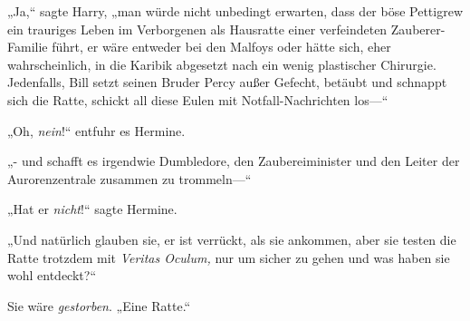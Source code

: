 „Ja,“ sagte Harry, „man würde nicht unbedingt erwarten, dass der böse Pettigrew ein trauriges Leben im Verborgenen als Hausratte einer verfeindeten Zauberer-Familie führt, er wäre entweder bei den Malfoys oder hätte sich, eher wahrscheinlich, in die Karibik abgesetzt nach ein wenig plastischer Chirurgie. Jedenfalls, Bill setzt seinen Bruder Percy außer Gefecht, betäubt und schnappt sich die Ratte, schickt all diese Eulen mit Notfall-Nachrichten los—“

„Oh, \emph{nein}!“ entfuhr es Hermine.

„- und schafft es irgendwie Dumbledore, den Zaubereiminister und den Leiter der Aurorenzentrale zusammen zu trommeln—“

„Hat er \emph{nicht}!“ sagte Hermine.

„Und natürlich glauben sie, er ist verrückt, als sie ankommen, aber sie testen die Ratte trotzdem mit \emph{Veritas Oculum,} nur um sicher zu gehen und was haben sie wohl entdeckt?“%

Sie wäre \emph{gestorben}. „Eine Ratte.“

